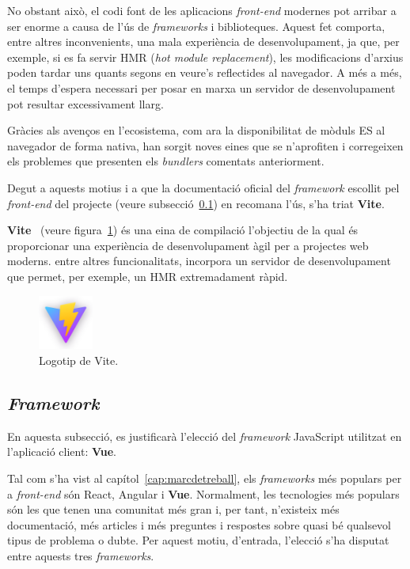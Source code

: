 \documentclass[a4paper,12pt]{ThesisStyle}
\begin{document}
No obstant això, el codi font de les aplicacions \textit{front-end} modernes pot arribar a ser enorme a causa de l'ús de \textit{frameworks} i biblioteques. Aquest fet comporta, entre altres inconvenients, una mala experiència de desenvolupament, ja que, per exemple, si es fa servir HMR (\textit{hot module replacement}), les modificacions d'arxius poden tardar uns quants segons en veure's reflectides al navegador. A més a més, el temps d'espera necessari per posar en marxa un servidor de desenvolupament pot resultar excessivament llarg.

Gràcies als avenços en l'ecosistema, com ara la disponibilitat de mòduls ES al navegador de forma nativa, han sorgit noves eines que se n'aprofiten i corregeixen els problemes que presenten els \textit{bundlers} comentats anteriorment.

Degut a aquests motius i a que la documentació oficial del \textit{framework} escollit pel \textit{front-end} del projecte (veure subsecció~\ref{subsec:decisions_client_framework}) en recomana l'ús, s'ha triat \textbf{Vite}.

\textbf{Vite}~\cite{Vite} (veure figura~\ref{img:logo_vite}) és una eina de compilació l'objectiu de la qual és proporcionar una experiència de desenvolupament àgil per a projectes web moderns. entre altres funcionalitats, incorpora un servidor de desenvolupament que permet, per exemple, un HMR extremadament ràpid.

\begin{figure}[H]
  \centering
  \includegraphics[width=0.16\textwidth]{assets/logos/Vite.png}
  \caption{\label{img:logo_vite}Logotip de Vite.}
\end{figure}

\subsection{\textit{Framework}}
\label{subsec:decisions_client_framework}

En aquesta subsecció, es justificarà l'elecció del \textit{framework} JavaScript utilitzat en l'aplicació client: \textbf{Vue}.

Tal com s'ha vist al capítol~\ref{cap:marcdetreball}, els \textit{frameworks} més populars per a \textit{front-end} són React, Angular i \textbf{Vue}. Normalment, les tecnologies més populars són les que tenen una comunitat més gran i, per tant, n'existeix més documentació, més articles i més preguntes i respostes sobre quasi bé qualsevol tipus de problema o dubte. Per aquest motiu, d'entrada, l'elecció s'ha disputat entre aquests tres \textit{frameworks}.
\end{document}
